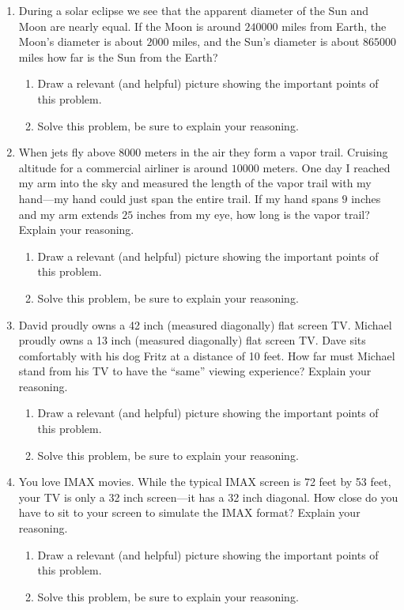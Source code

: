\begin{problems}
\begin{enumerate}
\item During a solar eclipse we see that the apparent diameter of the
  Sun and Moon are nearly equal. If the Moon is around $240000$ miles
  from Earth, the Moon's diameter is about $2000$ miles, and the Sun's
  diameter is about $865000$ miles how far is the Sun from the Earth?
\begin{enumerate}
\item Draw a relevant (and helpful) picture showing the important
  points of this problem.
\item Solve this problem, be sure to explain your reasoning.
\end{enumerate}


\item When jets fly above $8000$ meters in the air they form a vapor
  trail. Cruising altitude for a commercial airliner is around $10000$
  meters. One day I reached my arm into the sky and measured the
  length of the vapor trail with my hand---my hand could just span the
  entire trail. If my hand spans $9$ inches and my arm extends $25$
  inches from my eye, how long is the vapor trail? Explain your
  reasoning.
\begin{enumerate}
\item Draw a relevant (and helpful) picture showing the important
  points of this problem.
\item Solve this problem, be sure to explain your reasoning.
\end{enumerate}

\item David proudly owns a 42 inch (measured diagonally) flat screen
  TV. Michael proudly owns a 13 inch (measured diagonally) flat screen
  TV. Dave sits comfortably with his dog Fritz at a distance of 10
  feet. How far must Michael stand from his TV to have the ``same''
  viewing experience?  Explain your reasoning.
\begin{enumerate}
\item Draw a relevant (and helpful) picture showing the important
  points of this problem.
\item Solve this problem, be sure to explain your reasoning.
\end{enumerate}

\item You love IMAX movies. While the typical IMAX screen is 72 feet
  by 53 feet, your TV is only a 32 inch screen---it has a 32 inch
  diagonal. How close do you have to sit to your screen to simulate
  the IMAX format? Explain your reasoning.
\begin{enumerate}
\item Draw a relevant (and helpful) picture showing the important
  points of this problem.
\item Solve this problem, be sure to explain your reasoning.
\end{enumerate}


\end{enumerate}
\end{problems}
